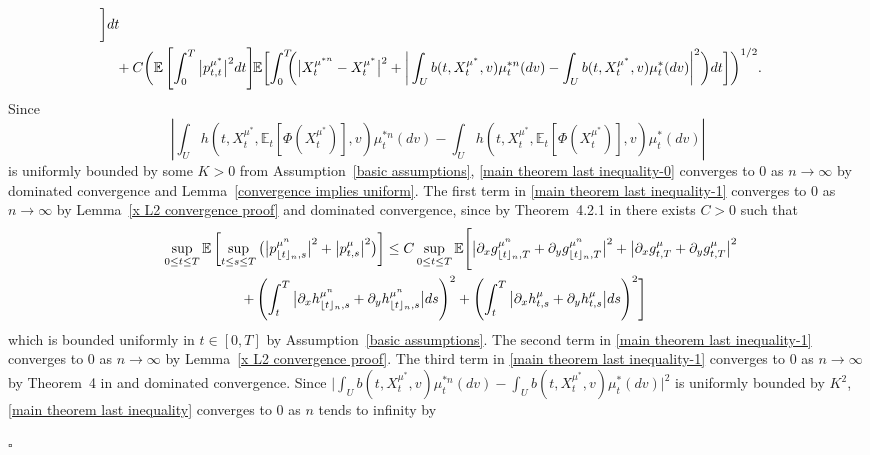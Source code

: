 \documentclass[12pt]{article}
\DeclarePairedDelimiter\floor{\lfloor}{\rfloor}
\theoremstyle{named}
\numberwithin{equation}{section}
\newenvironment{Proof}{\removelastskip\par\medskip \noindent{\em Proof.} \rm}{\penalty-20\null\hfill$\square$\par\medbreak}
\let\oldcitet=\citet
\renewcommand{\cite}[1]{\textcolor[rgb]{0,0,1}{\oldcitet{#1}}}
\renewcommand{\citet}[1]{\textcolor[rgb]{0,0,1}{\oldcitet{#1}}}
\begin{document}
\begin{Proof}
\begin{align}
    \biggr]dt
  \label{main theorem last inequality-1}
 \\
    &
 \hskip-0.1cm
 + C
  \biggl( \mathbb{E}\left[ \int_0^T\big| p^{\mu^*}_{t,t}\big|^2  dt\right]
  \hskip-0.1cm
  \mathbb{E} \biggl[ \int_0^T \hskip-0.2cm
\bigg(            \big|X^{\mu^{*n} }_t - X^{\mu^*}_t\big|^2 +
            \bigg|
            \int_U b(t,X^{\mu^*}_t,v) \mu^{*n} _t(dv) - \int_U b(t,X^{\mu^*}_t,v) \mu^*_t(dv)\bigg|^2 \bigg)
            dt \bigg] \biggr)^{ 1/2 }.
  \label{main theorem last inequality}
\end{align}
Since
$$\left| \int_U h(t,X^{\mu^*}_t,\mathbb{E}_t[\Phi(X^{\mu^*}_t)], v) \mu^{*n} _t(dv) - \int_U h(t,X^{\mu^*}_t,\mathbb{E}_t[\Phi(X^{\mu^*}_t)], v) \mu^*_t(dv) \right|
$$
is uniformly bounded by some $K>0$
from Assumption~\ref{basic assumptions},
 \eqref{main theorem last inequality-0} converges to $0$ as $n \to \infty$ by
dominated convergence and Lemma~\ref{convergence implies uniform}.
 The first term in \eqref{main theorem last inequality-1} converges to $0$ as $n \to \infty$ by Lemma~\ref{x L2 convergence proof} and
dominated convergence, since by
Theorem~4.2.1 in \cite{zhangjianfeng} there exists $C>0$
  such that
\begin{eqnarray}
\nonumber
  \lefteqn{
      \! \! \! \! \! \! \! \!
      \! \! \! \! \! \! \! \!
      \! \! \! \! \! \! \! \!
      \! \! \! \!
      \sup\limits_{0 \leq t \leq T}  \mathbb{E}\left[
        \sup\limits_{t \leq s \leq T}
        \big(
        \big| p^{{\mu}^n }_{\floor{t}_{n},s}\big|^2 + \big| p^{{\mu}}_{t,s} \big|^2
        \big)
        \right]
\leq C \sup\limits_{0 \leq t \leq T}\mathbb{E}\Biggl[
     \big| \partial_xg^{{\mu}^n }_{\floor{t}_{n},T} + \partial_yg^{{\mu}^n }_{\floor{t}_{n},T}\big|^2 + \big| \partial_xg^{{\mu}}_{t,T} + \partial_yg^{{\mu}}_{t,T} \big|^2
}
\\
  \label{bd}
& &
     + \left(
     \int_t^T \big| \partial_xh^{{\mu}^n }_{\floor{t}_{n},s} + \partial_yh^{{\mu}^n }_{\floor{t}_{n},s} \big| ds\right)^2 + \left(
     \int_t^T \big| \partial_xh^{{\mu}}_{t,s} + \partial_yh^{{\mu}}_{t,s} \big| ds
     \right)^2\Biggr]
\end{eqnarray}
which is bounded uniformly in $t \in [0,T]$ by Assumption~\ref{basic assumptions}.
 The second term in \eqref{main theorem last inequality-1} converges to $0$ as $n \to \infty$ by
Lemma~\ref{x L2 convergence proof}.
The third term in \eqref{main theorem last inequality-1} converges to $0$ as $n \to \infty$ by
Theorem~4 in \cite{fetter1977continuity} and dominated convergence.
 Since
$\big| \int_U b(t,X^{\mu^*}_t,v) \mu^{*n} _t(dv) - \int_U b(t,X^{\mu^*}_t,v) \mu^*_t(dv)\big|^2$ is uniformly bounded by $K^2$, \eqref{main theorem last inequality} converges to $0$ as $n$ tends to infinity by

\end{Proof}
\end{document}
